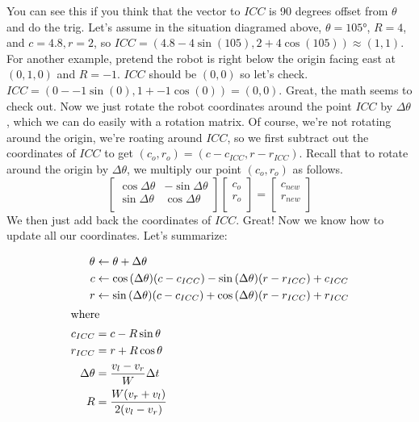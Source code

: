 \documentclass{article}
\begin{document}
You can see this if you think that the vector to $ICC$ is 90 degrees offset from $\theta$ and do the trig. Let's assume in the situation diagramed above, $\theta=\ang{105}$, $R=4$, and $c=4.8, r=2$, so $ICC = (4.8-4\sin{(105)}, 2+4\cos{(105)}) \approx (1, 1)$. For another example, pretend the robot is right below the origin facing east at $(0,1,0)$ and $R=-1$. $ICC$ should be $(0,0)$ so let's check. $ICC = (0-{-1}\sin{(0)}, 1+{-1}\cos{(0)}) = (0, 0).$ Great, the math seems to check out. Now we just rotate the robot coordinates around the point $ICC$ by $\Delta\theta$, which we can do easily with a rotation matrix. Of course, we're not rotating around the origin, we're roating around $ICC$, so we first subtract out the coordinates of $ICC$ to get $(c_o, r_o) = (c-c_{ICC}, r-r_{ICC})$. Recall that to rotate around the origin by $\Delta\theta$, we multiply our point $(c_o, r_o)$ as follows.
\begin{equation}
  \begin{bmatrix}
    \cos{\Delta\theta} & -\sin{\Delta\theta} \\
    \sin{\Delta\theta} & \cos{\Delta\theta} \\
  \end{bmatrix}
  \begin{bmatrix}
    c_o \\
    r_o \\
  \end{bmatrix}
  =
  \begin{bmatrix}
    c_{new} \\
    r_{new} \\
  \end{bmatrix}
\end{equation}
We then just add back the coordinates of $ICC$. Great! Now we know how to update all our coordinates. Let's summarize:

\begin{align}
 \theta &\leftarrow \theta + \Delta\theta \\
  c &\leftarrow \cos{(\Delta\theta)}(c-c_{ICC})-\sin{(\Delta\theta)}(r-r_{ICC}) + c_{ICC} \\
  r &\leftarrow \sin{(\Delta\theta)}(c-c_{ICC})+\cos{(\Delta\theta)}(r-r_{ICC}) + r_{ICC} \\
\shortintertext{where}
  c_{ICC} &= c-R\sin{\theta} \\
  r_{ICC} &= r+R\cos{\theta} \\
  \Delta\theta &= \frac{v_l-v_r}{W}\Delta t \\
  R &= \frac{W(v_r+v_l)}{2(v_l-v_r)}
\end{align}
\end{document}
